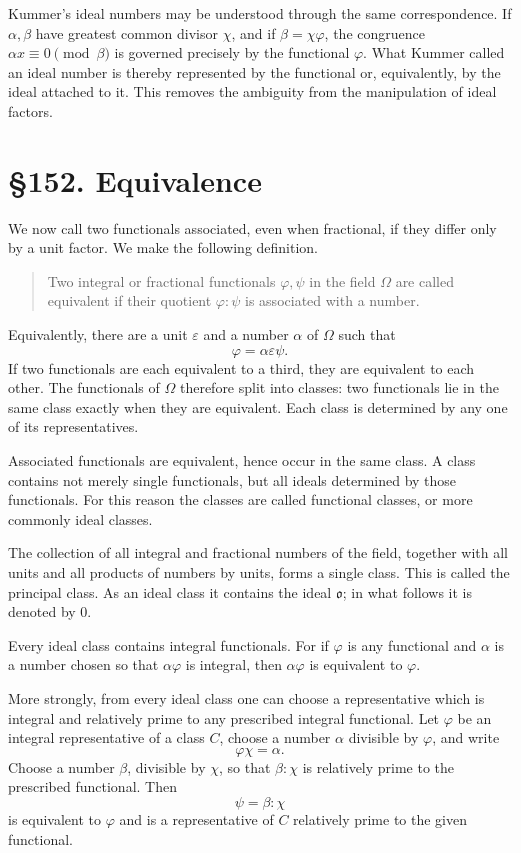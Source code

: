 \documentclass[12pt,a4paper]{article}
\newcommand{\webersection}[2]{\clearpage\section*{\S #1. #2}}
\begin{document}
Kummer's ideal numbers may be understood through the same correspondence.  If \(\alpha,\beta\) have greatest common divisor \(\chi\), and if \(\beta=\chi\varphi\), the congruence \(\alpha x\equiv0\pmod{\beta}\) is governed precisely by the functional \(\varphi\).  What Kummer called an ideal number is thereby represented by the functional or, equivalently, by the ideal attached to it.  This removes the ambiguity from the manipulation of ideal factors.

\webersection{152}{Equivalence}

We now call two functionals associated, even when fractional, if they differ only by a unit factor.  We make the following definition.

\begin{quote}
Two integral or fractional functionals \(\varphi,\psi\) in the field \(\Omega\) are called equivalent if their quotient \(\varphi:
\psi\) is associated with a number.
\end{quote}
Equivalently, there are a unit \(\varepsilon\) and a number \(\alpha\) of \(\Omega\) such that
\begin{equation}
 \varphi=\alpha\varepsilon\psi. \tag{1}
\end{equation}
If two functionals are each equivalent to a third, they are equivalent to each other.  The functionals of \(\Omega\) therefore split into classes: two functionals lie in the same class exactly when they are equivalent.  Each class is determined by any one of its representatives.

Associated functionals are equivalent, hence occur in the same class.  A class contains not merely single functionals, but all ideals determined by those functionals.  For this reason the classes are called functional classes, or more commonly ideal classes.

The collection of all integral and fractional numbers of the field, together with all units and all products of numbers by units, forms a single class.  This is called the principal class.  As an ideal class it contains the ideal \(\mathfrak o\); in what follows it is denoted by \(0\).

Every ideal class contains integral functionals.  For if \(\varphi\) is any functional and \(\alpha\) is a number chosen so that \(\alpha\varphi\) is integral, then \(\alpha\varphi\) is equivalent to \(\varphi\).

More strongly, from every ideal class one can choose a representative which is integral and relatively prime to any prescribed integral functional.  Let \(\varphi\) be an integral representative of a class \(C\), choose a number \(\alpha\) divisible by \(\varphi\), and write
\begin{equation}
 \varphi\chi=\alpha. \tag{2}
\end{equation}
Choose a number \(\beta\), divisible by \(\chi\), so that \(\beta:
\chi\) is relatively prime to the prescribed functional.  Then
\begin{equation}
 \psi=\beta:
\chi \tag{3}
\end{equation}
is equivalent to \(\varphi\) and is a representative of \(C\) relatively prime to the given functional.
\end{document}
